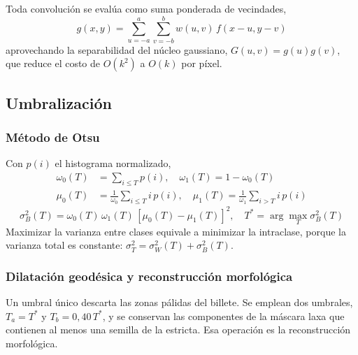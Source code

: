 \documentclass[conference]{IEEEtran}
\begin{document}
Toda convolución se evalúa como suma ponderada de vecindades,
\begin{equation}
g(x,y) = \sum_{u=-a}^{a}\sum_{v=-b}^{b} w(u,v)\,f(x-u,y-v)
\end{equation}
aprovechando la separabilidad del núcleo gaussiano,
$G(u,v)=g(u)g(v)$, que reduce el costo de $O(k^2)$ a $O(k)$ por píxel.

\subsection{Umbralización}

\subsubsection{Método de Otsu}
Con $p(i)$ el histograma normalizado,
\begin{align}
\omega_0(T) &= \sum_{i\le T} p(i), \quad \omega_1(T) = 1-\omega_0(T)\\
\mu_0(T) &= \frac{1}{\omega_0}\sum_{i\le T} i\,p(i), \quad
\mu_1(T) = \frac{1}{\omega_1}\sum_{i>T} i\,p(i)
\end{align}
\begin{equation}
\sigma_B^2(T) = \omega_0(T)\,\omega_1(T)\,[\mu_0(T)-\mu_1(T)]^2,
\quad T^{*} = \arg\max_T \sigma_B^2(T)
\end{equation}
Maximizar la varianza entre clases equivale a minimizar la intraclase,
porque la varianza total es constante:
$\sigma_T^2 = \sigma_W^2(T)+\sigma_B^2(T)$.

\subsubsection{Dilatación geodésica y reconstrucción morfológica}
Un umbral único descarta las zonas pálidas del billete. Se emplean dos
umbrales, $T_a = T^{*}$ y $T_b = 0{,}40\,T^{*}$, y se conservan las
componentes de la máscara laxa que contienen al menos una semilla de la
estricta. Esa operación es la reconstrucción morfológica.
\end{document}
